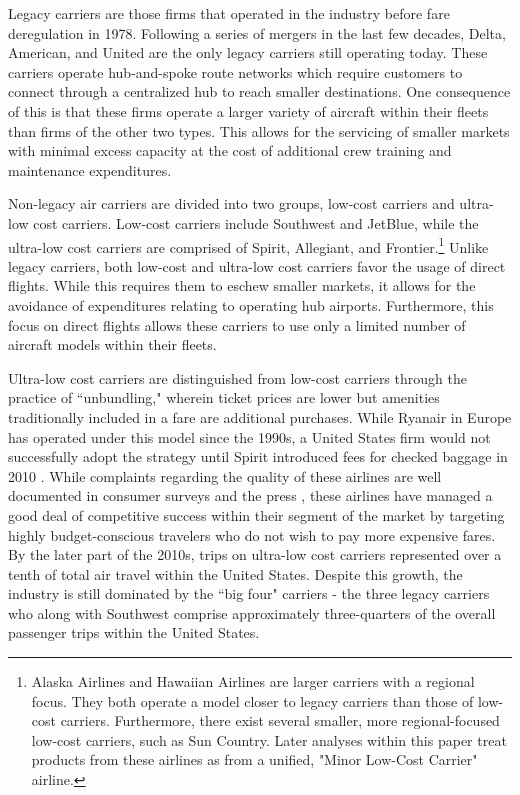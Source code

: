 \documentclass{article}
\begin{document}
	Legacy carriers are those firms that operated in the industry before fare deregulation in 1978. Following a series of mergers in the last few decades, Delta, American, and United are the only legacy carriers still operating today. These carriers operate hub-and-spoke route networks which require customers to connect through a centralized hub to reach smaller destinations. One consequence of this is that these firms operate a larger variety of aircraft within their fleets than firms of the other two types. This allows for the servicing of smaller markets with minimal excess capacity at the cost of additional crew training and maintenance expenditures.   
	
	Non-legacy air carriers are divided into two groups, low-cost carriers and ultra-low cost carriers. Low-cost carriers include Southwest and JetBlue, while the ultra-low cost carriers are comprised of Spirit, Allegiant, and Frontier.\footnote{Alaska Airlines and Hawaiian Airlines are larger carriers with a regional focus. They both operate a model closer to legacy carriers than those of low-cost carriers. Furthermore, there exist several smaller, more regional-focused low-cost carriers, such as Sun Country. Later analyses within this paper treat products from these airlines as from a unified, "Minor Low-Cost Carrier" airline.} Unlike legacy carriers, both low-cost and ultra-low cost carriers favor the usage of direct flights. While this requires them to eschew smaller markets, it allows for the avoidance of expenditures relating to operating hub airports. Furthermore, this focus on direct flights allows these carriers to use only a limited number of aircraft models within their fleets.

	Ultra-low cost carriers are distinguished from low-cost carriers through the practice of ``unbundling," wherein ticket prices are lower but amenities traditionally included in a fare are additional purchases. While Ryanair in Europe has operated under this model since the 1990s, a United States firm would not successfully adopt the strategy until Spirit introduced fees for checked baggage in 2010 \citep{bachwich_emergence_2017}. While complaints regarding the quality of these airlines are well documented in consumer surveys and the press \citep{vasel_spirit_2016, elliott_jetblue_2022}, these airlines have managed a good deal of competitive success within their segment of the market by targeting highly budget-conscious travelers who do not wish to pay more expensive fares. By the later part of the 2010s, trips on ultra-low cost carriers represented over a tenth of total air travel within the United States.  Despite this growth, the industry is still dominated by the ``big four" carriers - the three legacy carriers who along with Southwest comprise approximately three-quarters of the overall passenger trips within the United States. 
\end{document}
